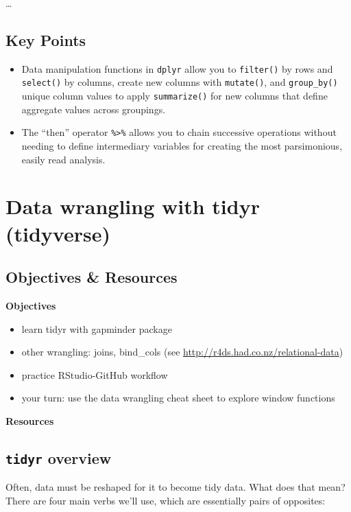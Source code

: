 \documentclass[]{book}
\providecommand{\tightlist}{%
  \setlength{\itemsep}{0pt}\setlength{\parskip}{0pt}}
\theoremstyle{definition}
\theoremstyle{definition}
\theoremstyle{definition}
\theoremstyle{remark}
\begin{document}
\ldots{}

\section{Key Points}\label{key-points}

\begin{itemize}
\tightlist
\item
  Data manipulation functions in \texttt{dplyr} allow you to
  \texttt{filter()} by rows and \texttt{select()} by columns, create new
  columns with \texttt{mutate()}, and \texttt{group\_by()} unique column
  values to apply \texttt{summarize()} for new columns that define
  aggregate values across groupings.
\item
  The ``then'' operator \texttt{\%\textgreater{}\%} allows you to chain
  successive operations without needing to define intermediary variables
  for creating the most parsimonious, easily read analysis.
\end{itemize}

\chapter{Data wrangling with tidyr (tidyverse)}\label{tidyr}

\section{Objectives \& Resources}\label{objectives-resources-3}

\textbf{Objectives}

\begin{itemize}
\tightlist
\item
  learn tidyr with gapminder package
\item
  other wrangling: joins, bind\_cols (see
  \url{http://r4ds.had.co.nz/relational-data})
\item
  practice RStudio-GitHub workflow
\item
  your turn: use the data wrangling cheat sheet to explore window
  functions
\end{itemize}

\textbf{Resources}

\section{\texorpdfstring{\texttt{tidyr}
overview}{tidyr overview}}\label{tidyr-overview}

Often, data must be reshaped for it to become tidy data. What does that
mean? There are four main verbs we'll use, which are essentially pairs
of opposites:
\end{document}
